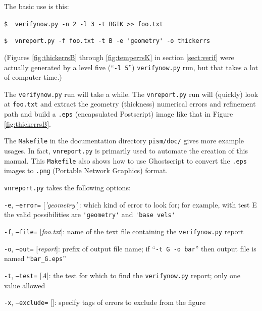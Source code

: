 \documentclass[11pt,final]{amsart}
\newcommand{\optoptdef}[3]{\vspace{1mm}\noindent \large\texttt{-#1},\,\,\texttt{--#2=}\normalsize\,\,[\textsl{#3}]:\quad}
\begin{document}
The basic use is this:

\verb|$  verifynow.py -n 2 -l 3 -t BGIK >> foo.txt|

\verb|$  vnreport.py -f foo.txt -t B -e 'geometry' -o thickerrs|

\noindent (Figures \ref{fig:thickerrsB} through \ref{fig:temperrsK} in section \ref{sect:verif} were actually generated by a level five (``\verb|-l 5|'') \verb|verifynow.py| run, but that takes a lot of computer time.)

The \verb|verifynow.py| run will take a while.  The \verb|vnreport.py| run will (quickly) look at \verb|foo.txt| and extract the geometry (thickness) numerical errors and refinement path and build a \verb|.eps| (encapsulated Postscript) image like that in Figure \ref{fig:thickerrsB}.

The \verb|Makefile| in the documentation directory \verb|pism/doc/| gives more example usages.  In fact, \verb|vnreport.py| is primarily used to automate the creation of this manual.  This \verb|Makefile| also shows how to use Ghostscript to convert the \verb|.eps| images to \verb|.png| (Portable Network Graphics) format.

\verb|vnreport.py| takes the following options:

\optoptdef{e}{error}{'geometry'} which kind of error to look for; for example, with test E the valid possibilities are \verb|'geometry'| and \verb|'base vels'|

\optoptdef{f}{file}{foo.txt} name of the text file containing the \verb|verifynow.py| report

\optoptdef{o}{out}{report} prefix of output file name; if ``\verb|-t G -o bar|'' then output file is named ``\verb|bar_G.eps|''

\optoptdef{t}{test}{A} the test for which to find the \verb|verifynow.py| report; only one value allowed

\optoptdef{x}{exclude}{} specify tags of errors to exclude from the figure


\end{document}
